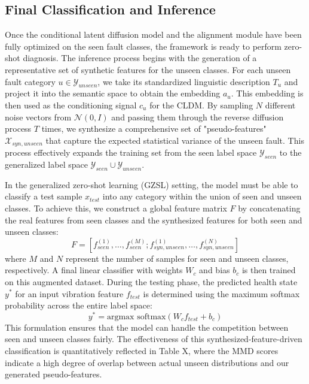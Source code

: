 \subsection{Final Classification and Inference}
\label{sec:inference}
Once the conditional latent diffusion model and the alignment module have been fully optimized on the seen fault classes, the framework is ready to perform zero-shot diagnosis. The inference process begins with the generation of a representative set of synthetic features for the unseen classes. For each unseen fault category $u \in \mathcal{Y}_{unseen}$, we take its standardized linguistic description $T_u$ and project it into the semantic space to obtain the embedding $a_u$. This embedding is then used as the conditioning signal $c_u$ for the CLDM. By sampling $N$ different noise vectors from $\mathcal{N}(0, I)$ and passing them through the reverse diffusion process $T$ times, we synthesize a comprehensive set of "pseudo-features" $\mathcal{X}_{syn, unseen}$ that capture the expected statistical variance of the unseen fault. This process effectively expands the training set from the seen label space $\mathcal{Y}_{seen}$ to the generalized label space $\mathcal{Y}_{seen} \cup \mathcal{Y}_{unseen}$.

In the generalized zero-shot learning (GZSL) setting, the model must be able to classify a test sample $x_{test}$ into any category within the union of seen and unseen classes. To achieve this, we construct a global feature matrix $F$ by concatenating the real features from seen classes and the synthesized features for both seen and unseen classes:
\begin{equation}
F = [f_{seen}^{(1)}, \dots, f_{seen}^{(M)}; f_{syn, unseen}^{(1)}, \dots, f_{syn, unseen}^{(N)}]
\end{equation}
where $M$ and $N$ represent the number of samples for seen and unseen classes, respectively. A final linear classifier with weights $W_c$ and bias $b_c$ is then trained on this augmented dataset. During the testing phase, the predicted health state $y^*$ for an input vibration feature $f_{test}$ is determined using the maximum softmax probability across the entire label space:
\begin{equation}
y^* = \text{argmax } \text{softmax}(W_c f_{test} + b_c)
\end{equation}
This formulation ensures that the model can handle the competition between seen and unseen classes fairly. The effectiveness of this synthesized-feature-driven classification is quantitatively reflected in Table X, where the MMD scores indicate a high degree of overlap between actual unseen distributions and our generated pseudo-features.


